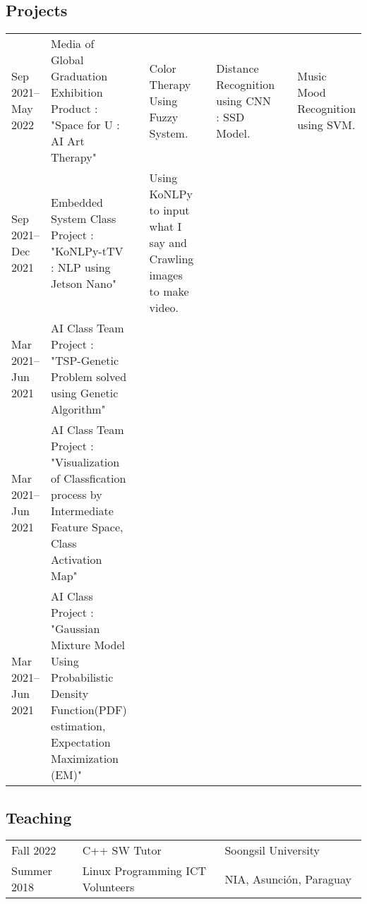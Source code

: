 \documentclass[12pt,]{scrartcl}
\begin{document}
\newpage

\subsection{Projects}\label{projects}
\begin{table}[h]
{\def\arraystretch{1.5}\tabcolsep=0pt
\begin{tabular}{p{0.30\linewidth}p{0.70\linewidth}}

  Sep 2021--May 2022 & Media of Global Graduation Exhibition Product : "Space for U : AI Art Therapy" 
  & & Color Therapy Using Fuzzy System. & & Distance Recognition using CNN : SSD Model. 
  & & Music Mood Recognition using SVM. \\
  
  Sep 2021--Dec 2021 & Embedded System Class Project : "KoNLPy-tTV : NLP using Jetson Nano" & & Using KoNLPy to input what I say and Crawling images to make video. \\
  
  Mar 2021--Jun 2021 & AI Class Team Project : "TSP-Genetic Problem solved using Genetic Algorithm" \\
  
  Mar 2021--Jun 2021 & AI Class Team Project : "Visualization of Classfication process by Intermediate Feature Space, Class Activation Map" \\
  
  Mar 2021--Jun 2021 & AI Class Project : "Gaussian Mixture Model Using Probabilistic Density Function(PDF) estimation, Expectation Maximization (EM)" \\

\end{tabular}%
}
\end{table}

\subsection{Teaching}\label{teaching}

\begin{table}[!h]
{\def\arraystretch{1.5}\tabcolsep=0pt
\begin{tabular}{p{0.20\linewidth}p{0.40\linewidth}p{0.40\linewidth}}

  Fall 2022 & C++ SW Tutor & Soongsil University \\
  
  Summer 2018 & Linux Programming ICT Volunteers & NIA, Asunción, Paraguay \\

  
\end{tabular}%
}
\end{table}
\end{document}
